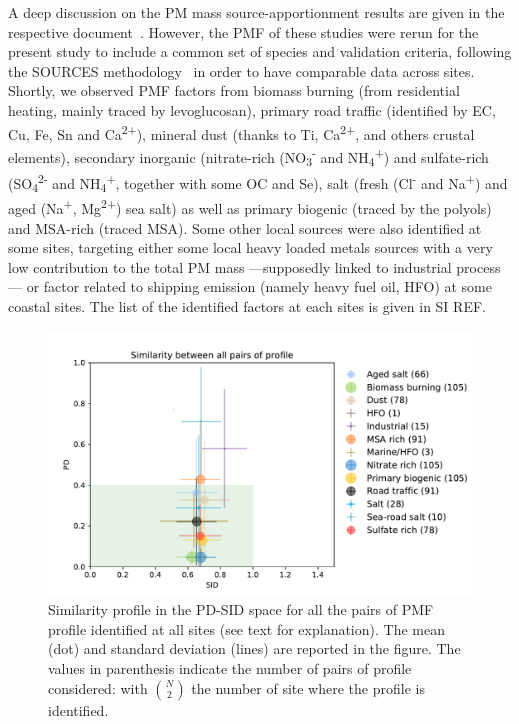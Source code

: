 \documentclass[acp]{copernicus}
\begin{document}
A deep discussion on the PM mass source-apportionment results are given
in the respective
document~\citep{borlazaFinescaleinprep.,chevrierChauffage2016,weberComparison2019}.
However, the PMF of these studies were rerun for the
present study to include a common set of species and validation
criteria, following the SOURCES
methodology~\citep{favezTraitement2017,weberComparison2019}
in order to have comparable data across sites. Shortly, we
observed PMF factors from biomass burning (from residential heating,
mainly traced by levoglucosan), primary road traffic (identified by EC,
Cu, Fe, Sn and Ca\textsuperscript{2+}), mineral dust (thanks to Ti,
Ca\textsuperscript{2+}, and others crustal elements), secondary
inorganic (nitrate-rich (NO\textsubscript{3}\textsuperscript{-} and
NH\textsubscript{4}\textsuperscript{+}) and sulfate-rich
(SO\textsubscript{4}\textsuperscript{2-} and
NH\textsubscript{4}\textsuperscript{+}, together with some OC and Se),
salt (fresh (Cl\textsuperscript{-} and Na\textsuperscript{+}) and aged
(Na\textsuperscript{+}, Mg\textsuperscript{2+}) sea salt) as well as
primary biogenic (traced by the polyols) and MSA-rich (traced MSA). Some
other local sources were also identified at some sites, targeting either
some local heavy loaded metals sources with a very low contribution to
the total PM mass ---supposedly linked to industrial process--- or
factor related to shipping emission (namely heavy fuel oil, HFO) at some
coastal sites. The list of the identified factors at each sites is given
in SI REF.

\begin{figure}[ht]
    \centering
    \includegraphics[width=0.8\linewidth]{figures/fig2}
    \caption{
        Similarity profile in the PD-SID space for all the pairs of PMF profile
        identified at all sites (see text for explanation). The mean (dot) and
        standard deviation (lines) are reported in the figure. The values in
        parenthesis indicate the number of pairs of profile considered: with $\binom{N}{2}$
        the number of site where the profile is identified.
    }%
    \label{fig:fig2}
\end{figure}
\end{document}
